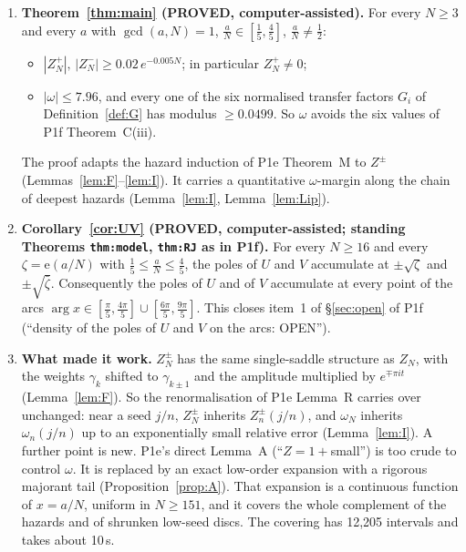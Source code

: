 \documentclass[11pt]{article}
\theoremstyle{definition}\newtheorem{definition}[theorem]{Definition}
\theoremstyle{remark}\newtheorem{remark}[theorem]{Remark}
\newcommand{\e}{\mathrm{e}}
\begin{document}
\begin{enumerate}
\item[(a)] \textbf{Theorem~\ref{thm:main} (PROVED, computer-assisted).} For every $N\ge3$ and every $a$ with $\gcd(a,N)=1$, $\frac aN\in[\frac15,\frac45]$, $\frac aN\ne\frac12$:
 \begin{itemize}
 \item $|Z^+_N|,\,|Z^-_N|\ge0.02\,e^{-0.005N}$; in particular $Z^+_N\neq0$;
 \item $|\omega|\le7.96$, and every one of the six normalised transfer factors $G_i$ of Definition~\ref{def:G} has modulus $\ge0.0499$. So $\omega$ avoids the six values of P1f Theorem~C(iii).
 \end{itemize}
 The proof adapts the hazard induction of P1e Theorem~M to $Z^\pm$ (Lemmas~\ref{lem:F}--\ref{lem:I}). It carries a quantitative $\omega$-margin along the chain of deepest hazards (Lemma~\ref{lem:I}, Lemma~\ref{lem:Lip}).
\item[(b)] \textbf{Corollary~\ref{cor:UV} (PROVED, computer-assisted; standing Theorems \texttt{thm:model}, \texttt{thm:RJ} as in P1f).} For every $N\ge16$ and every $\zeta=\e(a/N)$ with $\frac15\le\frac aN\le\frac45$, the poles of $U$ and $V$ accumulate at $\pm\sqrt\zeta$ and $\pm\sqrt{\bar\zeta}$. Consequently the poles of $U$ and of $V$ accumulate at every point of the arcs $\arg x\in[\frac\pi5,\frac{4\pi}5]\cup[\frac{6\pi}5,\frac{9\pi}5]$. This closes item~1 of \S\ref{sec:open} of P1f (``density of the poles of $U$ and $V$ on the arcs: OPEN'').
\item[(c)] \textbf{What made it work.} $Z^\pm_N$ has the same single-saddle structure as $Z_N$, with the weights $\gamma_k$ shifted to $\gamma_{k\pm1}$ and the amplitude multiplied by $e^{\mp\pi it}$ (Lemma~\ref{lem:F}). So the renormalisation of P1e Lemma~R carries over unchanged: near a seed $j/n$, $Z^\pm_N$ inherits $Z^\pm_n(j/n)$, and $\omega_N$ inherits $\omega_n(j/n)$ up to an exponentially small relative error (Lemma~\ref{lem:I}). A further point is new. P1e's direct Lemma~A (``$Z=1+$small'') is too crude to control $\omega$. It is replaced by an exact low-order expansion with a rigorous majorant tail (Proposition~\ref{prop:A}). That expansion is a continuous function of $x=a/N$, uniform in $N\ge151$, and it covers the whole complement of the hazards and of shrunken low-seed discs. The covering has 12,205 intervals and takes about 10\,s.
\end{enumerate}
\end{document}
